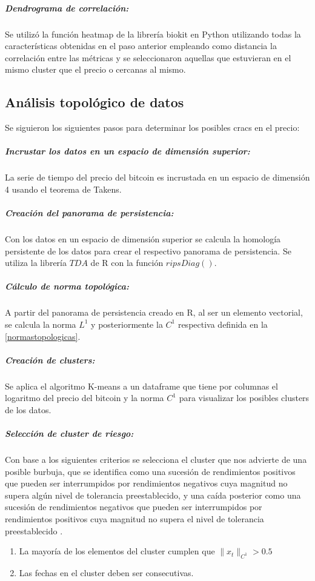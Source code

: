 \subparagraph{Dendrograma de correlación:}
Se utilizó la función heatmap de la librería biokit en Python utilizando todas la características obtenidas en el paso anterior empleando como distancia la correlación entre las métricas y se seleccionaron aquellas que estuvieran en el mismo cluster que el precio o cercanas al mismo.

\subsection{Análisis topológico de datos}
\label{met_tda}
Se siguieron los siguientes pasos para determinar los posibles cracs en el precio:

\subparagraph{Incrustar los datos en un espacio de dimensión superior:} La serie de tiempo del precio del bitcoin es incrustada en un espacio de dimensión 4 usando el teorema de Takens.
\subparagraph{Creación del panorama de persistencia:} Con los datos en un espacio de dimensión superior se calcula la homología persistente de los datos para crear el respectivo panorama de persistencia. Se utiliza la librería $TDA$ de R con la función $ripsDiag()$.
\subparagraph{Cálculo de norma topológica:} A partir del panorama de persistencia creado en R, al ser un elemento vectorial, se calcula la norma $L^1$ y posteriormente la $C^1$ respectiva definida en la \cref{normastopologicas}.

\subparagraph{Creación de clusters:} Se aplica el algoritmo K-means a un dataframe que tiene por columnas el logaritmo del precio del bitcoin y la norma $C^1$ para visualizar los posibles clusters de los datos.
\subparagraph{Selección de cluster de riesgo:} Con base a los siguientes criterios se selecciona el cluster que nos advierte de una posible burbuja, que se identifica como una sucesión de rendimientos positivos que pueden ser interrumpidos por rendimientos negativos cuya magnitud no supera algún nivel de tolerancia preestablecido, y una caída posterior como una sucesión de rendimientos negativos que pueden ser interrumpidos por rendimientos positivos cuya magnitud no supera el nivel de tolerancia preestablecido \parencite{gideaTopologicalRecognitionCritical2020}. 

\begin{enumerate}
	\item La mayoría de los elementos del cluster cumplen que $\lVert x_t \rVert_{C^1} > 0.5$
	\item Las fechas en el cluster deben ser consecutivas.
\end{enumerate}

